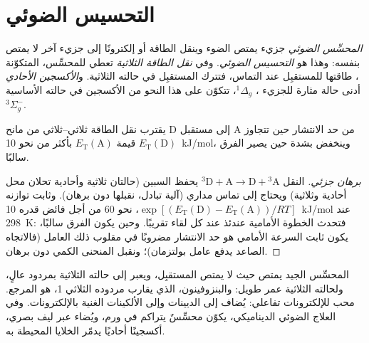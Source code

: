 \section{التحسيس الضوئي}

\begin{definition}\label{def:b3:photochemistry:sensitisation}
\emph{المحسِّس الضوئي} جزيء يمتص الضوء
وينقل الطاقة أو إلكترونًا إلى جزيء آخر لا
يمتص بنفسه: وهذا هو \emph{التحسيس الضوئي}. وفي
\emph{نقل الطاقة الثلاثية} تعطي 
للمحسِّس، المتكوّنة ، طاقتها للمستقبِل
عند التماس، فتترك المستقبِل في حالته الثلاثية. و\emph{الأكسجين
الأحادي} أدنى حالة مثارة للجزيء ،
${}^1\Delta_g$، تتكوّن على هذا النحو من الأكسجين في حالته الأساسية ${}^3\Sigma_g^-$.
\end{definition}

\begin{proposition}\label{prop:b3:photochemistry:sensitisation-condition}
يقترب نقل الطاقة ثلاثي--ثلاثي من مانح D إلى مستقبل A من
حد الانتشار حين تتجاوز $E_{\mathrm T}(\mathrm D)$ قيمة $E_{\mathrm T}(\mathrm A)$ بأكثر من نحو \qty{10}{kJ/mol}، 
وينخفض بشدة حين يصير الفرق سالبًا.
\end{proposition}

\begin{proof}[برهان جزئي]
النقل ${}^3\mathrm D + \mathrm A \to \mathrm D + {}^3\mathrm A$ يحفظ السبين (حالتان ثلاثية وأحادية تحلان محل
أحادية وثلاثية) ويحتاج إلى تماس مداري (آلية تبادل،
نقبلها دون برهان). وثابت توازنه $\exp[(E_{\mathrm T}(\mathrm D) - E_{\mathrm T}(\mathrm A))/RT]$، نحو 60 من أجل
فائض قدره \qty{10}{kJ/mol} عند \qty{298}{K}: فتحدث الخطوة الأمامية عندئذ عند كل
لقاء تقريبًا. وحين يكون الفرق سالبًا، يكون ثابت السرعة الأمامي هو
حد الانتشار مضروبًا في مقلوب ذلك العامل (فالاتجاه الصاعد يدفع
عامل بولتزمان)؛ ونقبل المنحنى الكمي دون برهان.
\end{proof}

المحسِّس الجيد يمتص حيث لا يمتص المستقبِل، ويعبر إلى حالته الثلاثية
بمردود عالٍ، ولحالته الثلاثية عمر طويل: والبنزوفينون، الذي يقارب
مردوده الثلاثي 1، هو المرجع.  محب للإلكترونات
تفاعلي: يُضاف إلى الديينات وإلى الألكينات الغنية بالإلكترونات. وفي العلاج
الضوئي الديناميكي، يكوّن محسِّسٌ يتراكم في ورم، ويُضاء عبر
ليف بصري، أكسجينًا أحاديًا يدمّر الخلايا المحيطة به.


